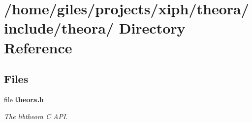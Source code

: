 \section{/home/giles/projects/xiph/theora/include/theora/ Directory Reference}
\label{dir_000001}
\subsection*{Files}
\begin{CompactItemize}
\item 
file {\bf theora.h}
\begin{CompactList}\small\item\em The libtheora C API. \item\end{CompactList}

\end{CompactItemize}
